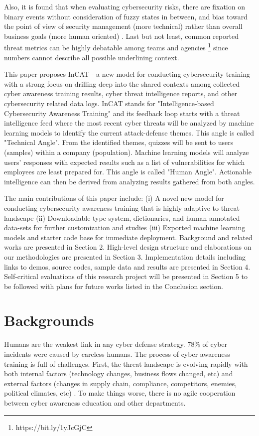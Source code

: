 \documentclass{article} %
\begin{document}
Also, it is found that when evaluating cybersecurity risks, there are fixation on binary events without consideration of fuzzy states in between, and bias toward the point of view of security management (more technical) rather than overall business goals (more human oriented) \cite{Dhillon2011Developer-drivenTrenches} \cite{Bayuk2013SecurityConstruct}. Last but not least, common reported threat metrics can be highly debatable among teams and agencies \footnote{https://bit.ly/1yJcGjC} since numbers cannot describe all possible underlining context. 

This paper proposes InCAT - a new model for conducting cybersecurity training with a strong focus on drilling deep into the shared contexts among collected cyber awareness training results, cyber threat intelligence reports, and other cybersecurity related data logs. InCAT stands for "Intelligence-based Cybersecurity Awareness Training" and its feedback loop starts with a threat intelligence feed where the most recent cyber threats will be analyzed by machine learning models to identify the current attack-defense themes. This angle is called "Technical Angle". From the identified themes, quizzes will be sent to users (samples) within a company (population). Machine learning models will analyze users' responses with expected results such as a list of vulnerabilities for which employees are least prepared for. This angle is called "Human Angle". Actionable intelligence can then be derived from analyzing results gathered from both angles.

The main contributions of this paper include: (i) A novel new model for conducting cybersecurity awareness training that is highly adaptive to threat landscape (ii) Downloadable type system, dictionaries, and human annotated data-sets for further customization and studies (iii) Exported machine learning models and starter code base for immediate deployment. Background and related works are presented in Section 2. High-level design structure and elaborations on our methodologies are presented in Section 3. Implementation details including links to demos, source codes, sample data and results are presented in Section 4. Self-critical evaluations of this research project will be presented in Section 5 to be followed with plans for future works listed in the Conclusion section.

\section{Backgrounds}
Humans are the weakest link in any cyber defense strategy. 78\% of cyber incidents were caused by careless humans\cite{PonemonInstitute20172017Overview}. The process of cyber awareness training is full of challenges. First, the threat landscape is evolving rapidly with both internal factors (technology changes, business flows changed, etc) and external factors (changes in supply chain, compliance, competitors, enemies, political climates, etc) \cite{Ingalsbe2008ThreatEnd, Manadhata2011AnMetric}. To make things worse, there is no agile cooperation between cyber awareness education and other departments. 
\end{document}
